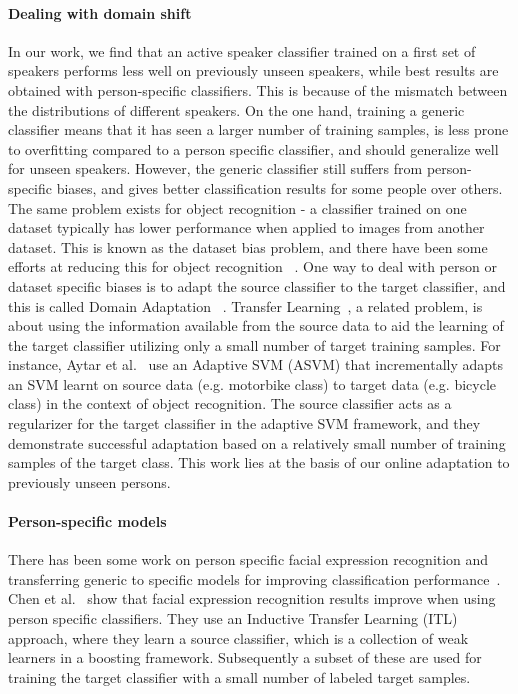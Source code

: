 \documentclass[runningheads]{llncs}
\begin{document}
\paragraph{Dealing with domain shift}
In our work, we find that an active speaker classifier trained on a first set of speakers performs less well on previously unseen speakers, while best results are obtained with person-specific classifiers. This is because of the mismatch between the distributions of different speakers.
On the one hand, training a generic classifier means that it has seen a larger number of training samples, is less prone to overfitting compared to a person specific classifier, and should generalize well for unseen speakers. However, the generic classifier still suffers from person-specific biases, and gives better classification results for some people over others. 
The same problem exists for object recognition - a classifier trained on one dataset typically has lower performance when applied to images from another dataset.
This is known as the dataset bias problem, and there have been some efforts at reducing this for object recognition ~\cite{Khosla12,Tommasi13}.
%
One way to deal with person or dataset specific biases is to adapt the source classifier to the target classifier, and this is called Domain Adaptation ~\cite{Aljundi15,Fernando13}.
%
Transfer Learning~\cite{Aytar11,Tommasi09,Tommasi10}, a related problem, is about using the information available from the source data to aid the learning of the target classifier utilizing only a small number of target training samples.
For instance, Aytar et al.~\cite{Aytar11} use an Adaptive SVM (ASVM) that incrementally adapts an SVM learnt on source data (e.g. motorbike class) to target data (e.g. bicycle class) in the context of object recognition. The source classifier acts as a regularizer for the target classifier in the adaptive SVM framework, and they demonstrate successful adaptation based on a relatively small number of training samples of the target class.
This work lies at the basis of our online adaptation to previously unseen persons.

\paragraph{Person-specific models} There has been some work on person specific facial expression recognition and transferring generic to specific models for improving classification performance~\cite{Chen12,Chu13,Zen14}.
Chen et al.~\cite{Chen12} show that facial expression recognition results improve when using person specific classifiers. They use an Inductive Transfer Learning (ITL) approach, where they learn a source classifier, which is a collection of weak learners in a boosting framework. Subsequently a subset of these are used for training the target classifier with a small number of labeled target samples. 
\end{document}
